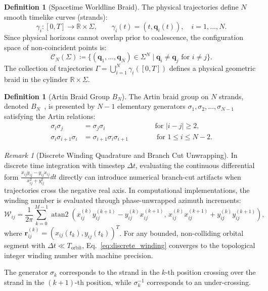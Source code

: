 \documentclass[11pt,a4paper,reqno]{article}
\theoremstyle{plain}
\theoremstyle{definition}
\newtheorem{definition}[theorem]{Definition}
\theoremstyle{remark}
\newtheorem{remark}[theorem]{Remark}
\numberwithin{equation}{section}
\begin{document}
\begin{definition}[Spacetime Worldline Braid]
The physical trajectories define $N$ smooth timelike curves (strands):
\begin{equation}
\gamma_i: [0, T] \to \mathbb{R} \times \Sigma, \qquad \gamma_i(t) = (t, \bm{q}_i(t)), \quad i = 1, \dots, N.
\end{equation}
Since physical horizons cannot overlap prior to coalescence, the configuration space of non-coincident points is:
\begin{equation}
\mathcal{C}_N(\Sigma) \coloneqq \{ (\bm{q}_1, \dots, \bm{q}_N) \in \Sigma^N \mid \bm{q}_i \neq \bm{q}_j \text{ for } i \neq j \}.
\end{equation}
The collection of trajectories $\Gamma = \bigcup_{i=1}^N \gamma_i([0, T])$ defines a physical geometric braid in the cylinder $\mathbb{R} \times \Sigma$.
\end{definition}

\begin{definition}[Artin Braid Group $B_N$]
The Artin braid group on $N$ strands, denoted $B_N$~\cite{Artin1947,Birman1974}, is presented by $N - 1$ elementary generators $\sigma_1, \sigma_2, \dots, \sigma_{N-1}$ satisfying the Artin relations:
\begin{align}
\sigma_i \sigma_j &= \sigma_j \sigma_i \qquad\quad\qquad\qquad\text{for } |i - j| \ge 2, \label{eq:artin_commute} \\
\sigma_i \sigma_{i+1} \sigma_i &= \sigma_{i+1} \sigma_i \sigma_{i+1} \qquad\qquad\text{for } 1 \le i \le N - 2. \label{eq:artin_braid}
\end{align}
\begin{remark}[Discrete Winding Quadrature and Branch Cut Unwrapping]
In discrete time integration with timestep $\Delta t$, evaluating the continuous differential form $\frac{x_{ij}\dot{y}_{ij} - y_{ij}\dot{x}_{ij}}{x_{ij}^2 + y_{ij}^2} dt$ directly can introduce numerical branch-cut artifacts when trajectories cross the negative real axis. In computational implementations, the winding number is evaluated through phase-unwrapped azimuth increments:
\begin{equation}
\label{eq:discrete_winding}
\mathcal{W}_{ij} = \frac{1}{2\pi} \sum_{k=0}^{M-1} \operatorname{atan2}\left(x_{ij}^{(k)} y_{ij}^{(k+1)} - y_{ij}^{(k)} x_{ij}^{(k+1)}, \, x_{ij}^{(k)} x_{ij}^{(k+1)} + y_{ij}^{(k)} y_{ij}^{(k+1)}\right),
\end{equation}
where $\bm{r}_{ij}^{(k)} = (x_{ij}(t_k), y_{ij}(t_k))^T$. For any bounded, non-colliding orbital segment with $\Delta t \ll T_{\mathrm{orbit}}$, Eq.~\eqref{eq:discrete_winding} converges to the topological integer winding number with machine precision.
\end{remark}
The generator $\sigma_k$ corresponds to the strand in the $k$-th position crossing over the strand in the $(k+1)$-th position, while $\sigma_k^{-1}$ corresponds to an under-crossing.
\end{definition}
\end{document}
